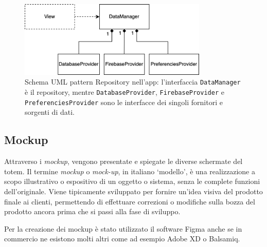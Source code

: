 \begin{figure}
    \centering
    \includegraphics[width=0.8\textwidth]{img/app/repository_pattern_scheme.png}
    \caption{Schema UML pattern Repository nell'app: l'interfaccia \texttt{DataManager} è il repository, mentre \texttt{DatabaseProvider}, \texttt{FirebaseProvider} e \texttt{PreferenciesProvider} sono le interfacce dei singoli fornitori e sorgenti di dati.}
    \label{fig:repoPattern}
\end{figure}

\subsection{Mockup}
Attraverso i \textit{mockup}, vengono presentate e spiegate le diverse schermate del totem.
Il termine \textit{mockup} o \textit{mock-up}, in italiano \enquote*{modello}, è una realizzazione a scopo illustrativo o espositivo di un oggetto o sistema, senza le complete funzioni dell'originale. Viene tipicamente sviluppato per fornire un'idea visiva del prodotto finale ai clienti, permettendo di effettuare correzioni o modifiche sulla bozza del prodotto ancora prima che si passi alla fase di sviluppo.

Per la creazione dei mockup è stato utilizzato il software Figma anche se in commercio ne esistono molti altri come ad esempio Adobe XD o Balsamiq.

